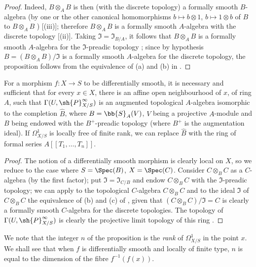 \begin{proof}
Indeed, $B \otimes_A B$ is then (with the discrete topology) a formally smooth $B$-algebra (by one or the other canonical homomorphisms $b \mapsto b \otimes 1$, $b \mapsto 1 \otimes b$ of $B$
to $B \otimes_A B$
) [(iii)];
therefore $B \otimes_A B$ is a formally smooth $A$-algebra with the discrete topology [(ii)].
Taking $\mathfrak{I} = \mathfrak{I}_{B/A}$, it follows that $B \otimes_A B$ is a formally smooth $A$-algebra for the $\mathfrak{I}$-preadic topology ;
since by hypothesis $B = (B \otimes_A B)/\mathfrak{I}$ is a formally smooth $A$-algebra for the discrete topology, the proposition follows from the equivalence of (a) and (b) in .
\end{proof}

\begin{proposition}[16.10.3]
\label{IV.16.10.3}
For a morphism $f:X \to S$ to be differentially smooth, it is necessary and sufficient that for every $x \in X$, there is an affine open neighbourhood of $x$, of ring $A$, such that $\Gamma(U, \sh{P}_{X/S}^\infty)$ is an augmented topological $A$-algebra isomorphic to the completion $\widehat{B}$, where $B = \bb{S}_A(V)$, $V$ being a projective $A$-module and $B$ being endowed with the $B^+$-preadic topology (where $B^+$ is the augmentation ideal).
If $\Omega_{X/S}^1$ is locally free of finite rank, we can replace $\widehat{B}$ with the ring of formal series $A[[T_1, \dots, T_n]]$.
\end{proposition}

\begin{proof}
The notion of a differentially smooth morphism is clearly local on $X$, so we reduce to the case where $S = \Spec(B)$, $X = \Spec(C)$.
Consider $C \otimes_B C$ as a $C$-algebra (by the first factor);
put $\mathfrak{I} = \mathfrak{I}_{C/B}$ and endow $C \otimes_B C$ with the $\mathfrak{I}$-preadic topology;
we can apply to the topological $C$-algebra $C \otimes_B C$ and to the ideal $\mathfrak{I}$ of $C \otimes_B C$ the equivalence of (b) and (c) of , given that $(C \otimes_B C)/\mathfrak{I} = C$ is clearly a formally smooth $C$-algebra for the discrete topologies.
The topology of $\Gamma(U, \sh{P}_{X/S}^\infty)$ is clearly the projective limit topology of this ring .
\end{proof}

We note that the integer $n$ of the proposition  is the \emph{rank} of $\Omega_{X/S}^1$ in the point $x$.
We shall see  that when $f$ is differentially smooth and locally of finite type, $n$ is equal to the dimension of the fibre $f^{-1}(f(x))$. 

